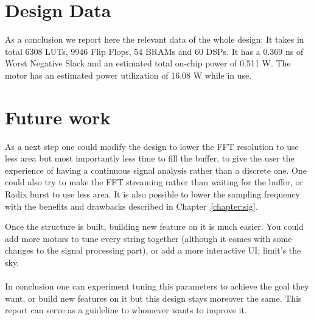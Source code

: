 \section{Design Data}
As a conclusion we report here the relevant data of the whole design:
It takes in total 6308 LUTs, 9946 Flip Flops, 54 BRAMs and 60 DSPs.
It has a 0.369 ns of Worst Negative Slack and an estimated total on-chip power
of 0.511 W.
The motor has an estimated power utilization of 16.08 W while in use.
\section{Future work}
As a next step one could modify the design to lower the FFT resolution to use less area but
most importantly less time to fill the buffer, to give the user the experience of having a continuous
signal analysis rather than a discrete one.
One could also try to make the FFT streaming rather than waiting for the buffer, or Radix burst to use less area.
It is also possible to lower the sampling frequency with the benefits and drawbacks described in Chapter~\ref{chapter:sig}.

Once the structure is built, building new feature on it is much easier. You could add more motors to tune every
string together (although it comes with some changes to the signal processing part), or add a more interactive UI; limit's the sky.

\paragraph{}
In conclusion one can experiment tuning this parameters to achieve the goal they want, or build new features on it
but this design stays moreover the same.
This report can serve as a guideline to whomever wants to improve it.